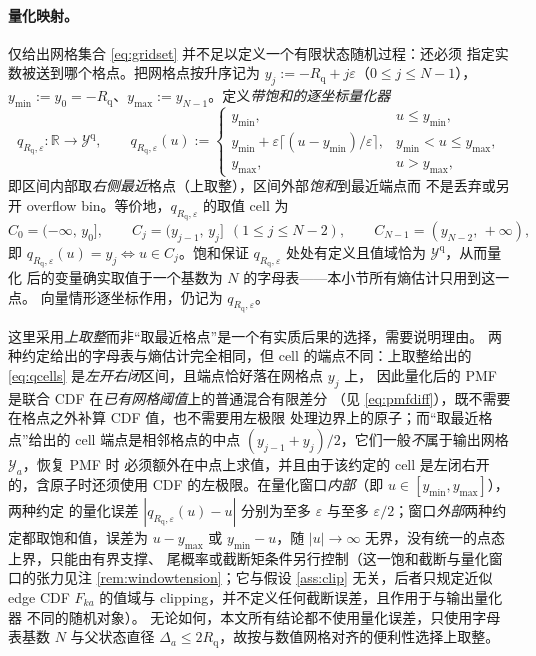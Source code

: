 \documentclass[a4paper,11pt]{article}
\theoremstyle{definition}
\newcommand{\R}{\mathbb R}
\newcommand{\1}{\mathbf 1}
\newcommand{\Rq}{R_{\mathrm{q}}}
\begin{document}
\paragraph{量化映射。}
仅给出网格集合 \eqref{eq:gridset} 并不足以定义一个有限状态随机过程：还必须
指定实数被送到哪个格点。把网格点按升序记为
$y_j:=-\Rq+j\varepsilon$（$0\le j\le N-1$），
$y_{\min}:=y_0=-\Rq$、$y_{\max}:=y_{N-1}$。定义\emph{带饱和的逐坐标量化器}
\begin{equation}
\label{eq:quantizer}
q_{\Rq,\varepsilon}:\R\to\mathcal Y^{\mathrm{q}},
\qquad
q_{\Rq,\varepsilon}(u)
:=
\begin{cases}
y_{\min}, & u\le y_{\min},\\[2pt]
y_{\min}+\varepsilon\bigl\lceil (u-y_{\min})/\varepsilon\bigr\rceil,
& y_{\min}<u\le y_{\max},\\[2pt]
y_{\max}, & u>y_{\max},
\end{cases}
\end{equation}
即区间内部取\emph{右侧最近}格点（上取整），区间外部\emph{饱和}到最近端点而
不是丢弃或另开 overflow bin。等价地，$q_{\Rq,\varepsilon}$ 的取值 cell 为
\begin{equation}
\label{eq:qcells}
C_0=(-\infty,\,y_0],
\qquad
C_j=(y_{j-1},\,y_j]\ \ (1\le j\le N-2),
\qquad
C_{N-1}=(y_{N-2},\,+\infty),
\end{equation}
即 $q_{\Rq,\varepsilon}(u)=y_j\iff u\in C_j$。饱和保证
$q_{\Rq,\varepsilon}$ 处处有定义且值域恰为 $\mathcal Y^{\mathrm{q}}$，从而量化
后的变量确实取值于一个基数为 $N$ 的字母表——本小节所有熵估计只用到这一点。
向量情形逐坐标作用，仍记为 $q_{\Rq,\varepsilon}$。

这里采用\emph{上取整}而非“取最近格点”是一个有实质后果的选择，需要说明理由。
两种约定给出的字母表与熵估计完全相同，但 cell 的端点不同：上取整给出的
\eqref{eq:qcells} 是\emph{左开右闭}区间，且端点恰好落在网格点 $y_j$ 上，
因此量化后的 PMF 是联合 CDF 在\emph{已有网格阈值}上的普通混合有限差分
（见 \eqref{eq:pmfdiff}），既不需要在格点之外补算 CDF 值，也不需要用左极限
处理边界上的原子；而“取最近格点”给出的 cell 端点是相邻格点的中点
$(y_{j-1}+y_j)/2$，它们一般\emph{不}属于输出网格 $\mathcal Y_a$，恢复 PMF 时
必须额外在中点上求值，并且由于该约定的 cell 是左闭右开的，含原子时还须使用
CDF 的左极限。在量化窗口\emph{内部}（即 $u\in[y_{\min},y_{\max}]$），两种约定
的量化误差 $|q_{\Rq,\varepsilon}(u)-u|$ 分别为至多 $\varepsilon$ 与至多
$\varepsilon/2$；窗口\emph{外部}两种约定都取饱和值，误差为 $u-y_{\max}$ 或
$y_{\min}-u$，随 $|u|\to\infty$ 无界，没有统一的点态上界，只能由有界支撑、
尾概率或截断矩条件另行控制（这一饱和截断与量化窗口的张力见注
\ref{rem:windowtension}；它与假设 \ref{ass:clip} 无关，后者只规定近似 edge CDF
$\widehat F_{ka}$ 的值域与 clipping，并不定义任何截断误差，且作用于与输出量化器
不同的随机对象）。
无论如何，本文所有结论都不使用量化误差，只使用字母表基数 $N$ 与父状态直径
$\Delta_a\le2\Rq$，故按与数值网格对齐的便利性选择上取整。
\end{document}
